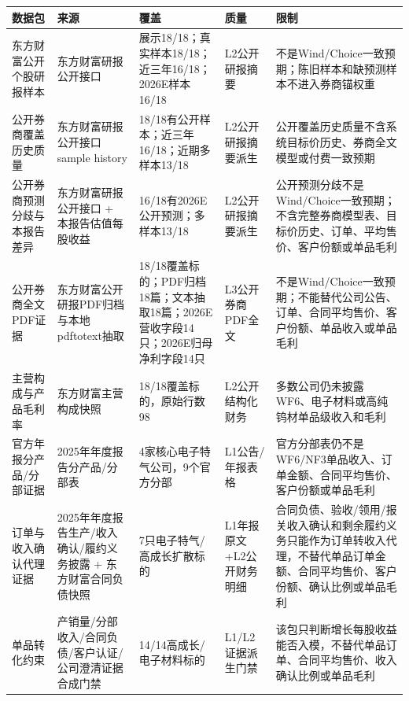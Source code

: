 \begin{exhibitbox}[结构化数据源健康（2）]
\scriptsize
\begin{tabularx}{\exhibitboxwidth}{L{2.1cm} L{2.4cm} L{2.4cm} L{1.5cm} X}
\toprule
\textbf{数据包} & \textbf{来源} & \textbf{覆盖} & \textbf{质量} & \textbf{限制} \\
\midrule
东方财富公开个股研报样本 & 东方财富研报公开接口 & 展示18/18；真实样本18/18；近三年16/18；2026E样本16/18 & L2公开研报摘要 & 不是Wind/Choice一致预期；陈旧样本和缺预测样本不进入券商锚权重 \\
公开券商覆盖历史质量 & 东方财富研报公开接口 sample history & 18/18有公开样本；近三年16/18；近期多样本13/18 & L2公开研报摘要派生 & 公开覆盖历史质量不含系统目标价历史、券商全文模型或付费一致预期 \\
公开券商预测分歧与本报告差异 & 东方财富研报公开接口 + 本报告估值每股收益 & 16/18有2026E公开预测；多样本13/18 & L2公开研报摘要派生 & 公开预测分歧不是Wind/Choice一致预期；不含完整券商模型表、目标价历史、订单、平均售价、客户份额或单品毛利 \\
公开券商全文PDF证据 & 东方财富公开研报PDF归档与本地pdftotext抽取 & 18/18覆盖标的；PDF归档18篇；文本抽取18篇；2026E营收字段14只；2026E归母净利字段14只 & L3公开券商PDF全文 & 不是Wind/Choice一致预期；不能替代公司公告、订单、合同平均售价、客户份额、单品收入或单品毛利 \\
主营构成与产品毛利率 & 东方财富主营构成快照 & 18/18覆盖标的，原始行数98 & L2公开结构化财务 & 多数公司仍未披露WF6、电子材料或高纯钨材单品级收入和毛利 \\
官方年报分产品/分部证据 & 2025年年度报告分产品/分部表 & 4家核心电子特气公司，9个官方分部 & L1公告/年报表格 & 官方分部表仍不是WF6/NF3单品收入、订单金额、合同平均售价、客户份额或单品毛利 \\
订单与收入确认代理证据 & 2025年年度报告生产/收入确认/履约义务披露 + 东方财富合同负债快照 & 7只电子特气/高成长扩散标的 & L1年报原文+L2公开财务明细 & 合同负债、验收/领用/报关收入确认和剩余履约义务只能作为订单转收入代理，不替代单品订单金额、合同平均售价、客户份额、确认比例或单品毛利 \\
单品转化约束 & 产销量/分部收入/合同负债/客户认证/公司澄清证据合成门禁 & 14/14高成长/电子材料标的 & L1/L2证据派生门禁 & 该包只判断增长每股收益能否入模，不替代单品订单、合同平均售价、收入确认比例或单品毛利 \\
\bottomrule
\end{tabularx}
\end{exhibitbox}

